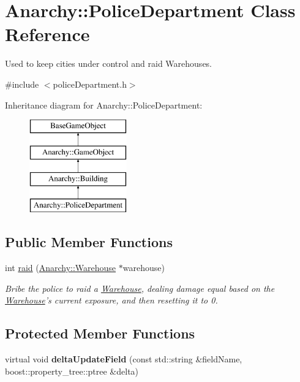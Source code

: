 \hypertarget{classAnarchy_1_1PoliceDepartment}{\section{Anarchy\-:\-:Police\-Department Class Reference}
\label{classAnarchy_1_1PoliceDepartment}
}


Used to keep cities under control and raid Warehouses.  




{\ttfamily \#include $<$police\-Department.\-h$>$}

Inheritance diagram for Anarchy\-:\-:Police\-Department\-:\begin{figure}[H]
\begin{center}
\leavevmode
\includegraphics[height=4.000000cm]{classAnarchy_1_1PoliceDepartment}
\end{center}
\end{figure}
\subsection*{Public Member Functions}
\begin{DoxyCompactItemize}
\item 
int \hyperlink{classAnarchy_1_1PoliceDepartment_a88ac84ac3faad7d8f34cd2ec77805272}{raid} (\hyperlink{classAnarchy_1_1Warehouse}{Anarchy\-::\-Warehouse} $\ast$warehouse)
\begin{DoxyCompactList}\small\item\em Bribe the police to raid a \hyperlink{classAnarchy_1_1Warehouse}{Warehouse}, dealing damage equal based on the \hyperlink{classAnarchy_1_1Warehouse}{Warehouse}'s current exposure, and then resetting it to 0. \end{DoxyCompactList}\end{DoxyCompactItemize}
\subsection*{Protected Member Functions}
\begin{DoxyCompactItemize}
\item 
\hypertarget{classAnarchy_1_1PoliceDepartment_a6103f32d50ebfa747a5c77fdd476136c}{virtual void {\bfseries delta\-Update\-Field} (const std\-::string \&field\-Name, boost\-::property\-\_\-tree\-::ptree \&delta)}\label{classAnarchy_1_1PoliceDepartment_a6103f32d50ebfa747a5c77fdd476136c}

\end{DoxyCompactItemize}
